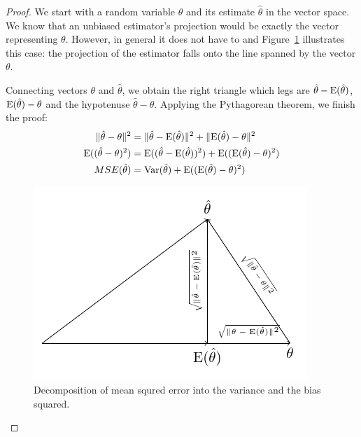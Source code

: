 \begin{proof}
We start with a random variable $\theta$ and its estimate $\hat \theta$ in the
vector space. We know that an unbiased estimator's projection would be exactly
the vector representing $\theta$. However, in general it does not have to and
Figure~\ref{fig:mse_decomposed} illustrates this case: the projection of the estimator falls onto
the line spanned by the vector $\theta$.

Connecting vectors $\theta$ and $\hat \theta$, we obtain the right triangle which
legs are $\hat \theta - \operatorname{E}(\hat\theta)$, $\operatorname{E}(\hat\theta) - \theta$ and the
hypotenuse $\hat \theta - \theta$.
Applying the Pythagorean theorem, we finish the proof:
\begin{align*}
\lVert \hat \theta - \theta \rVert^2 &= \lVert \hat \theta - \operatorname{E}(\hat \theta) \rVert^2  + \lVert \operatorname{E}(\hat \theta) - \theta \rVert^2 \\
\operatorname{E}((\hat \theta - \theta)^2) &= \operatorname{E}((\hat \theta - \operatorname{E}(\hat \theta))^2) + \operatorname{E}((\operatorname{E}(\hat \theta) - \theta)^2) \\
MSE(\hat \theta) &= \operatorname{Var}(\hat \theta) + \operatorname{E}((\operatorname{E}(\hat \theta) - \theta)^2)
\end{align*}

\begin{figure}[h!]
\begin{center}
\includegraphics[width=0.6\linewidth]{figures/01_mse_decomposition.pdf}
\caption{Decomposition of mean squred error into the variance and the bias squared.}
\label{fig:mse_decomposed}
\end{center}
\end{figure}

\end{proof}
